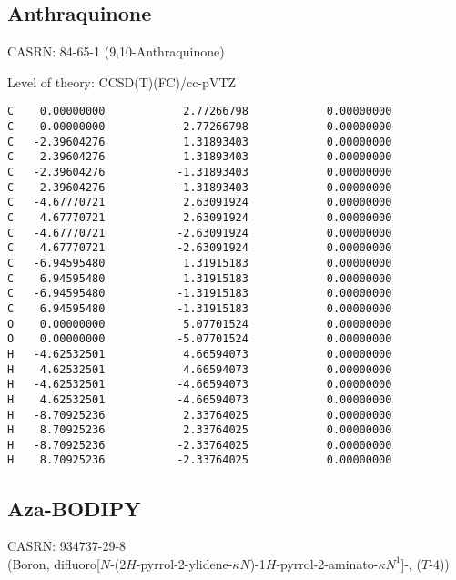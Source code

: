 \documentclass[journal=jctcce,manuscript=article,layout=traditional]{achemso}
\newcommand{\TZ}{cc-pVTZ}
\begin{document}
\subsection{Anthraquinone}

CASRN: 84-65-1 (9,10-Anthraquinone)

\begin{singlespace}
\noindent Level of theory: CCSD(T)(FC)/{\TZ}
\begin{verbatim}
C    0.00000000            2.77266798            0.00000000
C    0.00000000           -2.77266798            0.00000000
C   -2.39604276            1.31893403            0.00000000
C    2.39604276            1.31893403            0.00000000
C   -2.39604276           -1.31893403            0.00000000
C    2.39604276           -1.31893403            0.00000000
C   -4.67770721            2.63091924            0.00000000
C    4.67770721            2.63091924            0.00000000
C   -4.67770721           -2.63091924            0.00000000
C    4.67770721           -2.63091924            0.00000000
C   -6.94595480            1.31915183            0.00000000
C    6.94595480            1.31915183            0.00000000
C   -6.94595480           -1.31915183            0.00000000
C    6.94595480           -1.31915183            0.00000000
O    0.00000000            5.07701524            0.00000000
O    0.00000000           -5.07701524            0.00000000
H   -4.62532501            4.66594073            0.00000000
H    4.62532501            4.66594073            0.00000000
H   -4.62532501           -4.66594073            0.00000000
H    4.62532501           -4.66594073            0.00000000
H   -8.70925236            2.33764025            0.00000000
H    8.70925236            2.33764025            0.00000000
H   -8.70925236           -2.33764025            0.00000000
H    8.70925236           -2.33764025            0.00000000
\end{verbatim}
\end{singlespace}

\subsection{Aza-BODIPY}

CASRN: 934737-29-8 \\ (Boron, difluoro[$N$-(2$H$-pyrrol-2-ylidene-$\kappa$$N$)-1$H$-pyrrol-2-aminato-$\kappa$$N^1$]-, ($T$-4))
\end{document}
